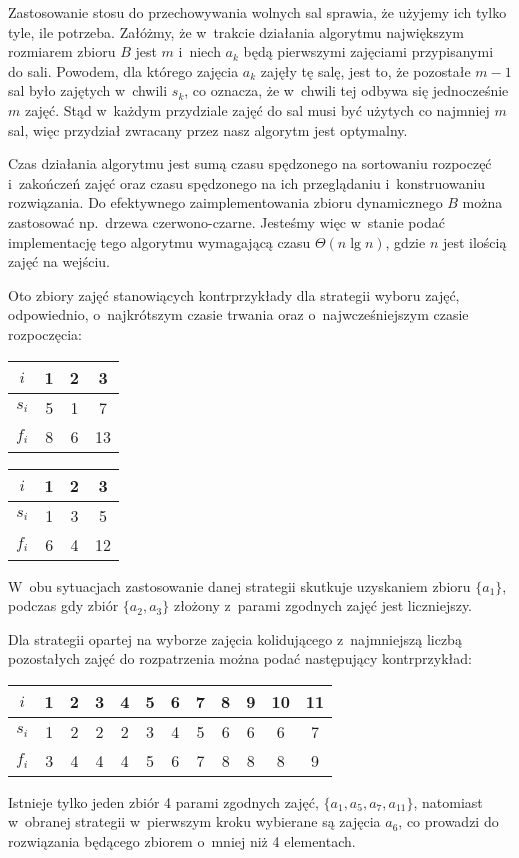 Zastosowanie stosu do przechowywania wolnych sal sprawia, że użyjemy ich tylko tyle, ile potrzeba.
Załóżmy, że w~trakcie działania algorytmu największym rozmiarem zbioru $B$ jest $m$ i~niech $a_k$ będą pierwszymi zajęciami przypisanymi do  sali.
Powodem, dla którego zajęcia $a_k$ zajęły tę salę, jest to, że pozostałe $m-1$ sal było zajętych w~chwili $s_k$, co oznacza, że w~chwili tej odbywa się jednocześnie $m$ zajęć.
Stąd w~każdym przydziale zajęć do sal musi być użytych co najmniej $m$ sal, więc przydział zwracany przez nasz algorytm jest optymalny.

Czas działania algorytmu jest sumą czasu spędzonego na sortowaniu rozpoczęć i~zakończeń zajęć oraz czasu spędzonego na ich przeglądaniu i~konstruowaniu rozwiązania.
Do efektywnego zaimplementowania zbioru dynamicznego $B$ można zastosować np.\ drzewa czerwono-czarne.
Jesteśmy więc w~stanie podać implementację tego algorytmu wymagającą czasu $\Theta(n\lg n)$, gdzie $n$ jest ilością zajęć na wejściu.

\exercise %

\noindent Oto zbiory zajęć stanowiących kontrprzykłady dla strategii wyboru zajęć, odpowiednio, o~najkrótszym czasie trwania oraz o~najwcześniejszym czasie rozpoczęcia:
\begin{center}
	\begin{tabular}{cccc}
		$i$ & 1 & 2 & 3 \\ \hline
		$s_i$ & 5 & 1 & 7 \\
		$f_i$ & 8 & 6 & 13
	\end{tabular}
	\hskip3cm
	\begin{tabular}{cccc}
		$i$ & 1 & 2 & 3 \\ \hline
		$s_i$ & 1 & 3 & 5 \\
		$f_i$ & 6 & 4 & 12
	\end{tabular}
\end{center}
W~obu sytuacjach zastosowanie danej strategii skutkuje uzyskaniem zbioru $\{a_1\}$, podczas gdy zbiór $\{a_2,a_3\}$ złożony z~parami zgodnych zajęć jest liczniejszy.

Dla strategii opartej na wyborze zajęcia kolidującego z~najmniejszą liczbą pozostałych zajęć do rozpatrzenia można podać następujący kontrprzykład:
\begin{center}
	\begin{tabular}{cccccccccccc}
		$i$ & 1 & 2 & 3 & 4 & 5 & 6 & 7 & 8 & 9 & 10 & 11 \\ \hline
		$s_i$ & 1 & 2 & 2 & 2 & 3 & 4 & 5 & 6 & 6 & 6 & 7 \\
		$f_i$ & 3 & 4 & 4 & 4 & 5 & 6 & 7 & 8 & 8 & 8 & 9
	\end{tabular}
\end{center}
Istnieje tylko jeden zbiór 4 parami zgodnych zajęć, $\{a_1,a_5,a_7,a_{11}\}$, natomiast w~obranej strategii w~pierwszym kroku wybierane są zajęcia $a_6$, co prowadzi do rozwiązania będącego zbiorem o~mniej niż 4 elementach.
